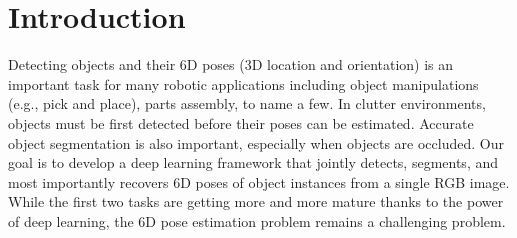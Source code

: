 \documentclass[conference]{IEEEtran}
\newcommand{\method}[1]{Deep-6DPose}
\begin{document}
\begin{abstract}
\end{abstract}
\IEEEpeerreviewmaketitle

%

\section{Introduction}
Detecting objects and their 6D poses (3D location and orientation) is an important task for many robotic applications including object manipulations (e.g., pick and place), parts assembly, to name a few. In clutter environments, objects must be first detected before their poses can be estimated. Accurate object segmentation is also important, especially when objects are occluded. Our goal is to develop a deep learning framework that jointly detects, segments,  and most importantly recovers 6D poses of object instances from a single RGB image. While the first two tasks are getting more and more mature thanks to the power of deep learning, the 6D pose estimation problem remains a challenging problem.
\end{document}
